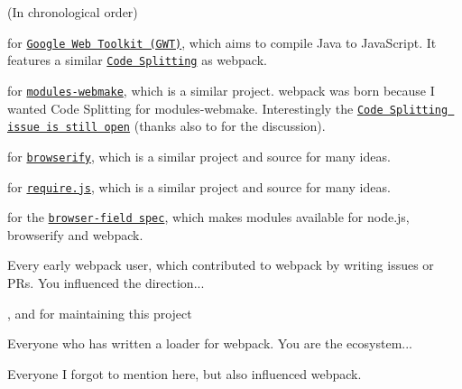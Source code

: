 (In chronological order)


\begin{DoxyItemize}
\item for \href{https://code.google.com/archive/p/google-web-toolkit}{\tt Google Web Toolkit (G\+WT)}, which aims to compile Java to Java\+Script. It features a similar \href{http://www.gwtproject.org/doc/latest/DevGuideCodeSplitting.html}{\tt Code Splitting} as webpack.
\item for \href{https://github.com/medikoo/modules-webmake}{\tt modules-\/webmake}, which is a similar project. webpack was born because I wanted Code Splitting for modules-\/webmake. Interestingly the \href{https://github.com/medikoo/modules-webmake/issues/7}{\tt Code Splitting issue is still open} (thanks also to  for the discussion).
\item for \href{http://browserify.org/}{\tt browserify}, which is a similar project and source for many ideas.
\item for \href{http://requirejs.org/}{\tt require.\+js}, which is a similar project and source for many ideas.
\item for the \href{https://gist.github.com/defunctzombie/4339901}{\tt browser-\/field spec}, which makes modules available for node.\+js, browserify and webpack.
\item Every early webpack user, which contributed to webpack by writing issues or P\+Rs. You influenced the direction...
\item ,  and  for maintaining this project
\item Everyone who has written a loader for webpack. You are the ecosystem...
\item Everyone I forgot to mention here, but also influenced webpack. 
\end{DoxyItemize}